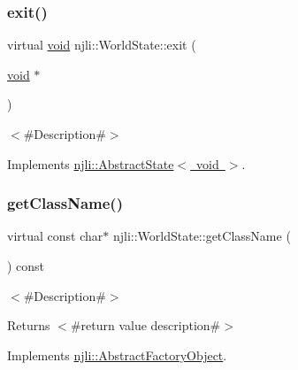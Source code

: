 \subsubsection{\texorpdfstring{exit()}{exit()}}
{\footnotesize\ttfamily virtual \mbox{\hyperlink{_thread_8h_af1e856da2e658414cb2456cb6f7ebc66}{void}} njli\+::\+World\+State\+::exit (\begin{DoxyParamCaption}\item[{\mbox{\hyperlink{_thread_8h_af1e856da2e658414cb2456cb6f7ebc66}{void}} $\ast$}]{ }\end{DoxyParamCaption})\hspace{0.3cm}{\ttfamily [virtual]}}

$<$\#\+Description\#$>$ 

Implements \mbox{\hyperlink{classnjli_1_1_abstract_state_a75207a4c62f813d8d84168024a30c60a}{njli\+::\+Abstract\+State$<$ void $>$}}.

\mbox{\label{classnjli_1_1_world_state_af6ff6a2f1813d2727014c3632be42add}} 
\subsubsection{\texorpdfstring{get\+Class\+Name()}{getClassName()}}
{\footnotesize\ttfamily virtual const char$\ast$ njli\+::\+World\+State\+::get\+Class\+Name (\begin{DoxyParamCaption}{ }\end{DoxyParamCaption}) const\hspace{0.3cm}{\ttfamily [virtual]}}

$<$\#\+Description\#$>$

\begin{DoxyReturn}{Returns}
$<$\#return value description\#$>$ 
\end{DoxyReturn}


Implements \mbox{\hyperlink{classnjli_1_1_abstract_factory_object_af4151e41b80d5bc3fc42822c67fc2278}{njli\+::\+Abstract\+Factory\+Object}}.

\mbox{\label{classnjli_1_1_world_state_ad41266885be835f3ee602311e20877a4}} 

